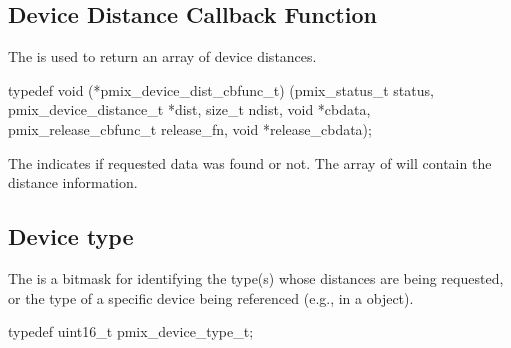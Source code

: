 \subsection{Device Distance Callback Function}

\summary

The  is used to return an array of device distances.

\cspecificstart
\begin{codepar}
typedef void (*pmix_device_dist_cbfunc_t)
    (pmix_status_t status,
     pmix_device_distance_t *dist,
     size_t ndist,
     void *cbdata,
     pmix_release_cbfunc_t release_fn,
     void *release_cbdata);
\end{codepar}
\cspecificend

\begin{arglist}
\end{arglist}


\descr

The  indicates if requested data was found or not.
The array of  will contain the distance information.

\subsection{Device type}
\label{api:proc:devtype}

The  is a  bitmask for identifying the type(s) whose distances are being requested, or the type of a specific device being referenced (e.g., in a  object).

\cspecificstart
\begin{codepar}
typedef uint16_t pmix_device_type_t;
\end{codepar}
\cspecificend

